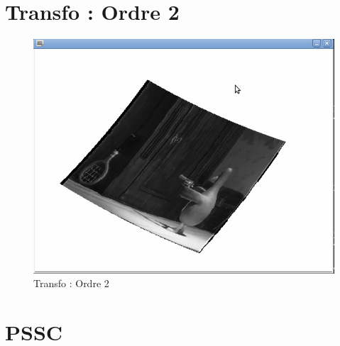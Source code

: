 \documentclass{beamer}
\begin{document}
\section{Transfo : Ordre 2}
\begin{frame}
\begin{figure}[!h]
\centering
\includegraphics[scale = 0.3]{Transfo_ordre_2.png}
\caption{Transfo : Ordre 2}
\end{figure}
\end{frame}

\section{PSSC}
\end{document}
